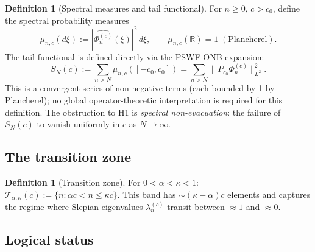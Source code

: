 \documentclass[12pt,a4paper]{amsart}
\theoremstyle{definition}
\newtheorem{definition}[theorem]{Definition}
\theoremstyle{remark}
\newcommand{\norm}[1]{\|#1\|}
\newcommand{\Phic}[2]{\Phi_{#2}^{(#1)}}
\newcommand{\Pc}{P_{c_0}}
\begin{document}
\begin{definition}[Spectral measures and tail functional]
\label{def:spectral-measures}
For $n\ge 0$, $c>c_0$, define the
spectral probability measures
\[
  \mu_{n,c}(d\xi)
  :=|\widehat{\Phi_n^{(c)}}(\xi)|^2\,d\xi,
  \qquad
  \mu_{n,c}(\mathbb{R})=1\;(\text{Plancherel}).
\]
The tail functional is defined directly
via the PSWF-ONB expansion:
\begin{equation}\label{eq:SN-def}
  S_N(c) := \sum_{n>N}\mu_{n,c}([-c_0,c_0])
  = \sum_{n>N}\norm{\Pc\Phic{c}{n}}^2_{L^2}.
\end{equation}
This is a convergent series of non-negative
terms (each bounded by 1 by Plancherel);
no global operator-theoretic interpretation
is required for this definition.
The obstruction to H1 is
\emph{spectral non-evacuation}:
the failure of $S_N(c)$ to vanish
uniformly in $c$ as $N\to\infty$.
\end{definition}

\subsection{The transition zone}

\begin{definition}[Transition zone]
\label{def:transition}
For $0<\alpha<\kappa<1$:
$\mathcal{T}_{\alpha,\kappa}(c)
:=\{n: \alpha c < n \le \kappa c\}$.
This band has $\sim(\kappa-\alpha)c$ elements
and captures the regime where Slepian
eigenvalues $\lambda_n^{(c)}$
transit between $\approx 1$ and $\approx 0$.
\end{definition}

\subsection{Logical status}
\end{document}
